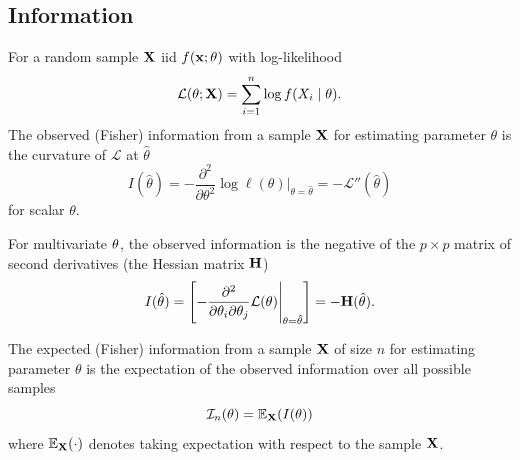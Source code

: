 \documentclass[10pt, a4paper]{article}
\begin{document}
\subsection{Information}

\begin{definition}
    For a random sample $\mathbf{X}$ iid $f(\mathbf{x}; \theta)$ with log-likelihood
    \[
    \mathcal{L}(\theta; \mathbf{X}) = \sum_{i = 1}^{n}\log{f(X_i\mid \theta)}.
    \]
    The observed
    (Fisher)
    information from a sample $\mathbf{X}$ for estimating parameter $\theta$ is the curvature of $\mathcal{L}$ at $\hat{\theta}$
    \[
    I(\hat{\theta}) = -\frac{\partial ^ 2}{\partial\theta ^ 2}\log{\ell(\theta)}\Biggr\rvert_{\theta = \hat{\theta}} = -\mathcal{L}''(\hat{\theta})
    \]
    for scalar $\theta$.

    For multivariate $\mathbf{\theta}$,
    the observed information is the negative of the $p \times p$ matrix of second derivatives
    (the Hessian matrix $\mathbf{H}$)
    \[
    I(\hat{\mathbf{\theta}}) = \left[-\frac{\partial ^ 2}{\partial\theta_i\partial\theta_j}\mathcal{L}(\mathbf{\theta})\Biggr\rvert_{\mathbf{\theta} = \mathbf{\hat{\theta}}}\right] = -\mathbf{H}(\hat{\mathbf{\theta}}).
    \]
\end{definition}

\begin{definition}
    The expected
    (Fisher)
    information from a sample $\mathbf{X}$ of size $n$ for estimating parameter $\theta$ is the expectation of the observed information over all possible samples
    \[
    \mathcal{I}_n(\theta) = \mathbb{E}_{\mathbf{X}}(I(\theta))
    \]
    where $\mathbb{E}_{\mathbf{X}}(\cdot)$ denotes taking expectation with respect to the sample $\mathbf{X}$.
\end{definition}
\end{document}
